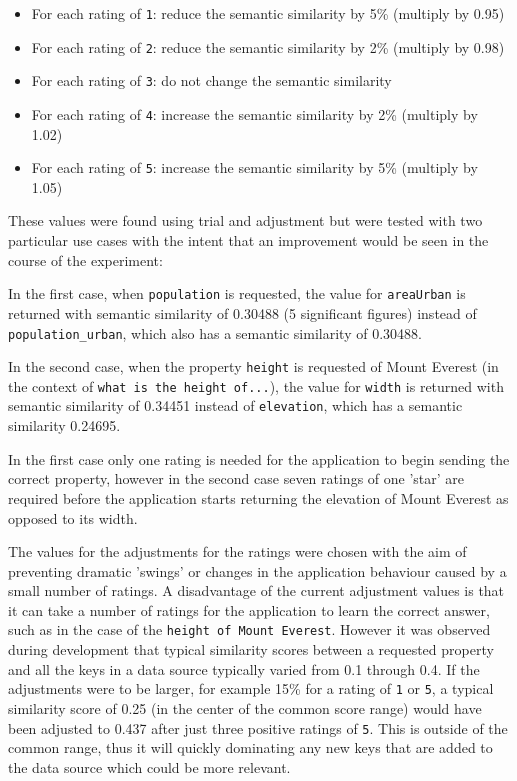 \documentclass[authoryearcitations]{UoYCSproject}
\begin{document}
\begin{itemize}
  \item For each rating of \texttt{1}: reduce the semantic similarity by 5\% (multiply by 0.95)
  \item For each rating of \texttt{2}: reduce the semantic similarity by 2\% (multiply by 0.98)
  \item For each rating of \texttt{3}: do not change the semantic similarity
  \item For each rating of \texttt{4}: increase the semantic similarity by 2\% (multiply by 1.02)
  \item For each rating of \texttt{5}: increase the semantic similarity by 5\% (multiply by 1.05)  
\end{itemize}

These values were found using trial and adjustment but were tested with two particular use cases with the intent that an improvement would be seen in the course of the experiment: 

In the first case, when \texttt{population} is requested, the value for \texttt{areaUrban} is returned with semantic similarity of 0.30488 (5 significant figures) instead of \texttt{population\_urban}, which also has a semantic similarity of 0.30488.

In the second case, when the property \texttt{height} is requested of Mount Everest (in the context of \texttt{what is the height of...}), the value for \texttt{width} is returned with semantic similarity of 0.34451 instead of \texttt{elevation}, which has a semantic similarity 0.24695.

In the first case only one rating is needed for the application to begin sending the correct property, however in the second case seven ratings of one 'star' are required before the application starts returning the elevation of Mount Everest as opposed to its width.

The values for the adjustments for the ratings were chosen with the aim of preventing dramatic 'swings' or changes in the application behaviour caused by a small number of ratings. A disadvantage of the current adjustment values is that it can take a number of ratings for the application to learn the correct answer, such as in the case of the \texttt{height of Mount Everest}. However it was observed during development that typical similarity scores between a requested property and all the keys in a data source typically varied from 0.1 through 0.4.  If the adjustments were to be larger, for example 15\% for a rating of \texttt{1} or \texttt{5}, a typical similarity score of 0.25 (in the center of the common score range) would have been adjusted to 0.437 after just three positive ratings of \texttt{5}. This is outside of the common range, thus it will quickly dominating any new keys that are added to the data source which could be more relevant. 
\end{document}
